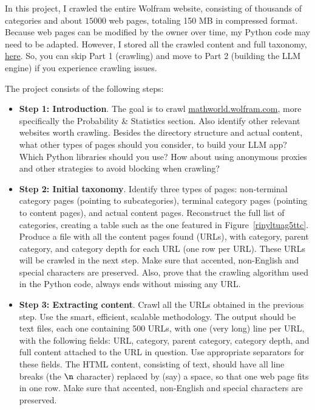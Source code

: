\documentclass[oneside,10pt]{book}
\begin{document}
\noindent In this project, I crawled the entire Wolfram website, consisting of thousands of categories and about 
$\num{15000}$ web pages, totaling 150 MB in compressed format. Because web pages can be modified by the owner over time, my Python code may need to be adapted. 
However, I stored all the crawled content and full taxonomy, 
\href{https://github.com/VincentGranville/Large-Language-Models/tree/main/crawl_dump_wolfram}{here}. So, you can skip Part 1 (crawling) and move to Part 2 (building the LLM engine)
 if you experience crawling issues.  

\noindent The project consists of the following steps: \vspace{1ex}

\begin{itemize}
\item[] {\bf Step 1:  Introduction}. The goal is to crawl  \href{https://mathworld.wolfram.com/}{mathworld.wolfram.com}, more specifically the 
Probability \& Statistics section. Also identify other relevant websites
 worth crawling. Besides the directory structure and actual content, what other types of pages should you consider, to build your LLM app?
Which Python libraries should you use? How about using anonymous proxies and other strategies to avoid blocking when crawling?
 \vspace{1ex}
\item[] {\bf Step 2: Initial taxonomy}.  Identify three types of pages: non-terminal category pages (pointing to subcategories), 
terminal category pages (pointing to content pages), and actual content pages. Reconstruct the full list of categories, creating a table such as
 the one featured in Figure~\ref{rinyltuag5ttc}. Produce a file with all the content pages found (URLs), with category, parent category, and category depth for each URL (one row per URL).
These URLs will be crawled in the next step. Make sure that accented, non-English and special characters are preserved. 
Also, prove that the crawling algorithm used in the Python code, always ends without missing any URL.
\vspace{1ex}
\item[] {\bf Step 3: Extracting content}.  Crawl all the URLs obtained in the previous step. Use the smart, efficient, scalable methodology.
The output should be text files, each one containing 500 URLs, with one (very long) line per URL, with the following fields:
 URL, category, parent category, category depth, and full content attached to the URL in question. 
Use appropriate separators for these fields. The HTML content, consisting of text, should have all line breaks (the $\text{\texttt{\textbackslash n}}$ character)
 replaced by (say) a space, so that one web page fits in one row. Make sure that accented, non-English and special characters are preserved. 
\end{itemize}
\vspace{1ex}
\end{document}
